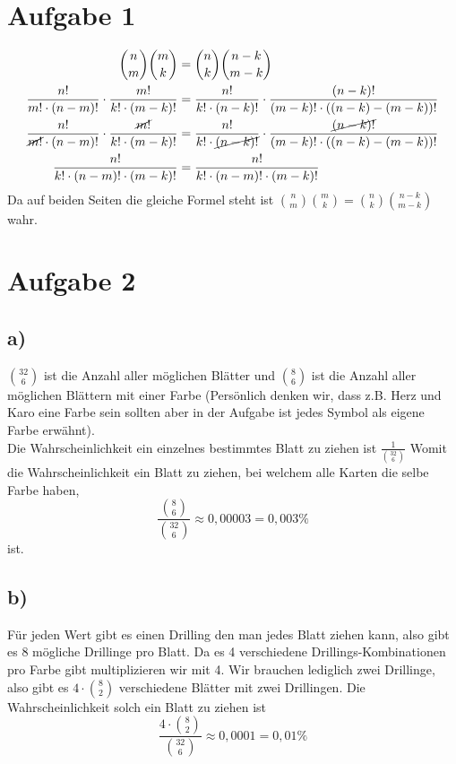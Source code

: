 \documentclass[12pt,german,a4paper]{article}
\title{#1}
\author{Mike Lenz, Jonas Tesfamariam}
\begin{document}
\maketitle	

\section*{Aufgabe 1}
\begin{align*}
	\binom{n}{m}\binom{m}{k}&=\binom{n}{k}\binom{n-k}{m-k} \\
  \frac{ n! }{ m!\cdot(n-m)! }\cdot \frac{ m! }{ k!\cdot(m-k)! } &= \frac{ n! }{ k!\cdot(n-k)! }\cdot \frac{ (n-k)! }{ (m-k)!\cdot((n-k)-(m-k))! } \\
	\frac{ n! }{ \cancel{m!}\cdot(n-m)! }\cdot \frac{ \cancel{m!} }{ k!\cdot(m-k)! } &= \frac{ n! }{ k!\cdot\cancel{(n-k)!} }\cdot \frac{ \cancel{(n-k)!} }{ (m-k)!\cdot((n-k)-(m-k))! } \\ 
	\frac{ n! }{ k!\cdot (n-m)!\cdot(m-k)! } &= \frac{ n! }{ k!\cdot (n-m)!\cdot(m-k)! } 
\end{align*}
Da auf beiden Seiten die gleiche Formel steht ist $\binom{n}{m}\binom{m}{k}=\binom{n}{k}\binom{n-k}{m-k}$ wahr. 
\pagebreak
\section*{Aufgabe 2}
\subsection*{a)}
$\binom{32}{6}$ ist die Anzahl aller möglichen Blätter und $\binom{8}{6}$ ist die Anzahl aller möglichen Blättern mit einer Farbe (Persönlich denken wir, dass z.B. Herz und Karo eine Farbe sein sollten aber in der Aufgabe ist jedes Symbol als eigene Farbe erwähnt). \\
Die Wahrscheinlichkeit ein einzelnes bestimmtes Blatt zu ziehen ist 
$\frac{ 1 }{ \binom{32}{6}}$
Womit die Wahrscheinlichkeit ein Blatt zu ziehen, bei welchem alle Karten die selbe Farbe haben,
$$
\frac{ \binom{8}{6} }{ \binom{32}{6} } \approx 0,00003 = 0,003\%
$$
ist.
\subsection*{b)}
Für jeden Wert gibt es einen Drilling den man jedes Blatt ziehen kann, also gibt es 8 mögliche Drillinge pro Blatt. Da es 4 verschiedene Drillings-Kombinationen pro Farbe gibt multiplizieren wir mit 4. Wir brauchen lediglich zwei Drillinge, also gibt es
$4\cdot\binom{8}{2}$ verschiedene Blätter mit zwei Drillingen.
Die Wahrscheinlichkeit solch ein Blatt zu ziehen ist
$$
\frac{ 4\cdot\binom{8}{2} }{ \binom{32}{6} } \approx 0,0001 = 0,01\%
$$
\pagebreak
\end{document}
